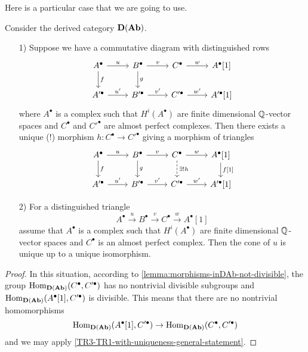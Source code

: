 Here is a particular case that we are going to use.

\begin{corollary}
  \label{TR3-TR1-with-uniqueness} Consider the derived category
  $\text{\bf D} (\text{\bf Ab})$.

  \begin{enumerate}
  \item[1)] Suppose we have a commutative diagram with distinguished rows
    \[ \begin{tikzcd}
        A^\bullet\ar{r}{u}\ar{d}{f} & B^\bullet\ar{r}{v}\ar{d}{g} & C^\bullet\ar{r}{w} & A^\bullet [1] \\
        A'^\bullet\ar{r}{u'} & B'^\bullet\ar{r}{v'} & C'^\bullet\ar{r}{w'} & A'^\bullet [1]
      \end{tikzcd} \]
    where $A^\bullet$ is a complex such that $H^i (A^\bullet)$ are finite
    dimensional $\mathbb{Q}$-vector spaces and $C^\bullet$ and $C'^\bullet$ are almost
    perfect complexes. Then there exists a unique (!) morphism
    $h\colon C^\bullet \to C'^\bullet$ giving a morphism of triangles
    \[ \begin{tikzcd}
        A^\bullet\ar{r}{u}\ar{d}{f} & B^\bullet\ar{r}{v}\ar{d}{g} & C^\bullet\ar{r}{w}\ar[dashed]{d}[d]{\exists ! h} & A^\bullet [1]\ar{d}{f [1]} \\
        A'^\bullet\ar{r}{u'} & B'^\bullet\ar{r}{v'} & C'^\bullet\ar{r}{w'} & A'^\bullet [1]
      \end{tikzcd} \]

  \item[2)] For a distinguished triangle
    \[ A^\bullet \xrightarrow{u}
      B^\bullet \xrightarrow{v}
      C^\bullet \xrightarrow{w}
      A^\bullet[1] \]
    assume that $A^\bullet$ is a complex such that $H^i (A^\bullet)$ are finite
    dimensional $\mathbb{Q}$-vector spaces and $C^\bullet$ is an almost perfect
    complex. Then the cone of $u$ is unique up to a unique isomorphism.
  \end{enumerate}

  \begin{proof}
    In this situation, according to \ref{lemma:morphisms-inDAb-not-divisible},
    the group $\operatorname{Hom}_{\text{\bf D} (\text{\bf Ab})} (C^\bullet, C'^\bullet)$ has no
    nontrivial divisible subgroups and
    $\operatorname{Hom}_{\text{\bf D} (\text{\bf Ab})} (A^\bullet [1], C'^\bullet)$ is
    divisible. This means that there are no nontrivial homomorphisms
    \[ \operatorname{Hom}_{\text{\bf D} (\text{\bf Ab})} (A^\bullet [1], C'^\bullet) \to
      \operatorname{Hom}_{\text{\bf D} (\text{\bf Ab})} (C^\bullet, C'^\bullet) \]
    and we may apply \ref{TR3-TR1-with-uniqueness-general-statement}.
  \end{proof}
\end{corollary}

